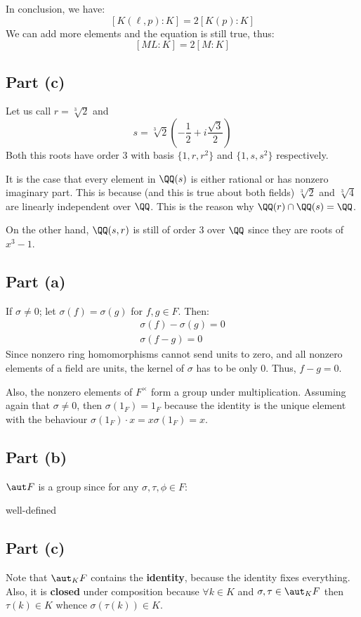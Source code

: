 In conclusion, we have:
$$[K(\ell, p):K] = 2[K(p):K]$$
We can add more elements and the equation is still true, thus:
$$[ML:K] = 2[M:K]$$

\subsection*{Part (c)}
Let us call $r=\sqrt[3] 2$ and
$$s=\sqrt[3] 2 \left( -\frac 12 + i \frac {\sqrt 3}2\right)$$
Both this roots have order 3 with basis $\{1,r,r^2\}$ and $\{1,s,s^2\}$ respectively.

It is the case that every element in $\QQ(s)$ is either rational or has nonzero imaginary part. This is because (and this is true about both fields) $\sqrt[3] 2$ and $\sqrt[3] 4$ are linearly independent over $\QQ$. This is the reason why $\QQ(r)\cap \QQ(s) =\QQ$. 

On the other hand, $\QQ(s,r)$ is still of order 3 over $\QQ$ since they are roots of $x^3-1$.

\subsection*{Part (a)}
If $\sigma \neq 0$; let $\sigma(f) = \sigma(g)$ for $f,g\in F$. Then:
\begin{gather*}
    \sigma(f)- \sigma(g)=0\\
    \sigma(f-g)=0
\end{gather*}
Since nonzero ring homomorphisms cannot send units to zero, and all nonzero elements of a field are units, the kernel of $\sigma$ has to be only 0. Thus, $f-g=0$.

Also, the nonzero elements of $F^\times$ form a group under multiplication. Assuming again that $\sigma\neq 0$, then $\sigma(1_F) =1_F$ because the identity is the unique element with the behaviour $\sigma(1_F)\cdot x = x \sigma(1_F) = x$.


\subsection*{Part (b)}
$\aut F$ is a group since for any $\sigma,\tau,\phi\in F$:
\begin{description}
    \item[well-defined] 
\end{description}

\subsection*{Part (c)}
Note that $\aut_K F$ contains the \textbf{identity}, because the identity fixes everything. Also, it is \textbf{closed} under composition because  $\forall k\in K$ and $\sigma,\tau\in \aut_K F$ then $\tau(k)\in K$ whence $\sigma(\tau(k))\in K$. 

